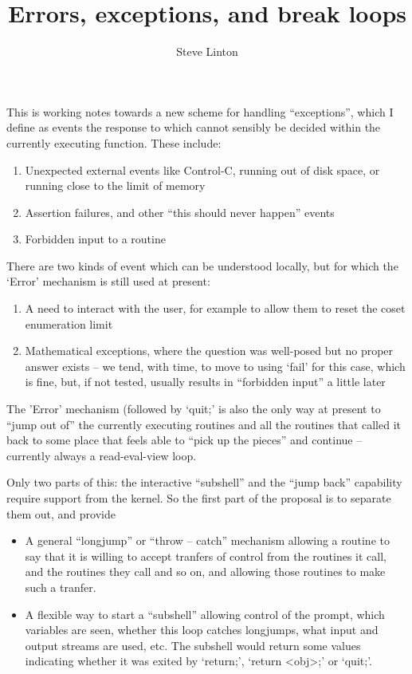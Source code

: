 \documentclass{article}
\title{Errors, exceptions, and break loops}
\author{Steve Linton}
\begin{document}
\maketitle

This is working notes towards a new scheme for handling
``exceptions'', which I define as events the response to which cannot
sensibly be decided within the currently executing function. These
include:
\begin{enumerate}
\item Unexpected external events like Control-C, running out of disk
space, or running close to the limit of memory
\item Assertion failures, and other ``this should never happen''
events
\item Forbidden input to a routine
\end{enumerate}

There are two kinds of event which can be understood locally, but for
which the `Error' mechanism is still used at present:
\begin{enumerate}
\item A need to interact with the user, for example to allow them to
reset the coset enumeration limit
\item Mathematical exceptions, where the question was well-posed but
no proper answer exists -- we tend, with time, to move to using `fail' 
for this case, which is fine, but, if not tested, usually results in
``forbidden input'' a little later
\end{enumerate}

The 'Error' mechanism (followed by `quit;' is also the only way at
present to ``jump out of'' the currently executing routines and all
the routines that called it back to some place that feels able to
``pick up the pieces'' and continue -- currently always a
read-eval-view loop.

Only two parts of this: the interactive ``subshell'' and the ``jump
back'' capability require support from the kernel. So the first part
of the proposal is to separate them out, and provide

\begin{itemize}
\item A general ``longjump'' or ``throw -- catch'' mechanism allowing
a routine to say that it is willing to accept tranfers of control from 
the routines it call, and the routines they call and so on, and
allowing those routines to make such a tranfer.
\item A flexible way to start a ``subshell'' allowing control of the
prompt, which variables are seen, whether this loop catches longjumps, 
what input and output streams are used, etc. The subshell would
return some values indicating whether it was exited by `return;',
`return <obj>;' or `quit;'.
\end{itemize}
\end{document}
